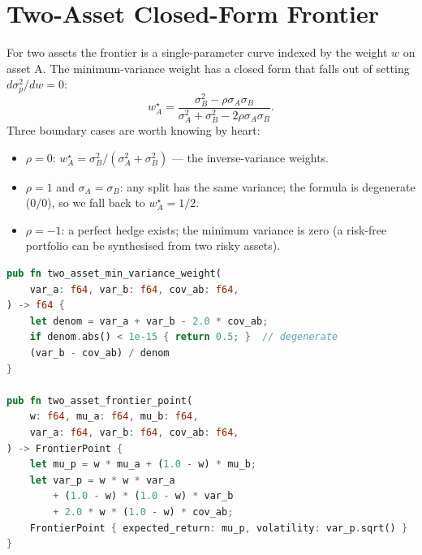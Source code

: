 \section{Two-Asset Closed-Form Frontier}


For two assets the frontier is a single-parameter curve indexed by the
weight $w$ on asset A. The minimum-variance weight has a closed form that
falls out of setting $d\sigma_p^2 / dw = 0$:
\[
w_A^\star = \frac{\sigma_B^2 - \rho \sigma_A \sigma_B}
                 {\sigma_A^2 + \sigma_B^2 - 2 \rho \sigma_A \sigma_B}.
\]
Three boundary cases are worth knowing by heart:
\begin{itemize}
    \item $\rho = 0$: $w_A^\star = \sigma_B^2 / (\sigma_A^2 + \sigma_B^2)$
      --- the inverse-variance weights.
    \item $\rho = 1$ and $\sigma_A = \sigma_B$: any split has the same
      variance; the formula is degenerate ($0/0$), so we fall back to
      $w_A^\star = 1/2$.
    \item $\rho = -1$: a perfect hedge exists; the minimum variance is
      zero (a risk-free portfolio can be synthesised from two risky
      assets).
\end{itemize}

\begin{lstlisting}[language=Rust]
pub fn two_asset_min_variance_weight(
    var_a: f64, var_b: f64, cov_ab: f64,
) -> f64 {
    let denom = var_a + var_b - 2.0 * cov_ab;
    if denom.abs() < 1e-15 { return 0.5; }  // degenerate
    (var_b - cov_ab) / denom
}

pub fn two_asset_frontier_point(
    w: f64, mu_a: f64, mu_b: f64,
    var_a: f64, var_b: f64, cov_ab: f64,
) -> FrontierPoint {
    let mu_p = w * mu_a + (1.0 - w) * mu_b;
    let var_p = w * w * var_a
        + (1.0 - w) * (1.0 - w) * var_b
        + 2.0 * w * (1.0 - w) * cov_ab;
    FrontierPoint { expected_return: mu_p, volatility: var_p.sqrt() }
}
\end{lstlisting}

